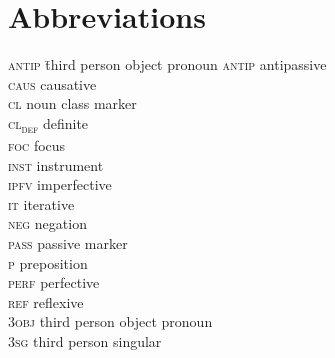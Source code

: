 \documentclass[output=paper]{langscibook}
\begin{document}





\section*{Abbreviations}
\begin{multicols}{2}
\begin{tabbing}
\textsc{antip}\hspace{.5cm} \= third person object pronoun\kill
\textsc{antip} \> antipassive\\
\textsc{caus} \> causative \\
\textsc{cl} \> noun class marker\\
\textsc{cl\textsubscript{def}} \> definite\\
\textsc{foc} \> focus\\
\textsc{inst} \> instrument\\
\textsc{ipfv} \> imperfective\\
\textsc{it} \> iterative\\
\textsc{neg} \> negation \\
\textsc{pass} \> passive marker \\
\textsc{p} \> preposition\\
\textsc{perf} \> perfective\\
\textsc{ref} \> reflexive \\
\textsc{3obj} \> third person object pronoun\\
\textsc{3sg} \>  third person singular
\end{tabbing}
\end{multicols}
 
\end{document}
